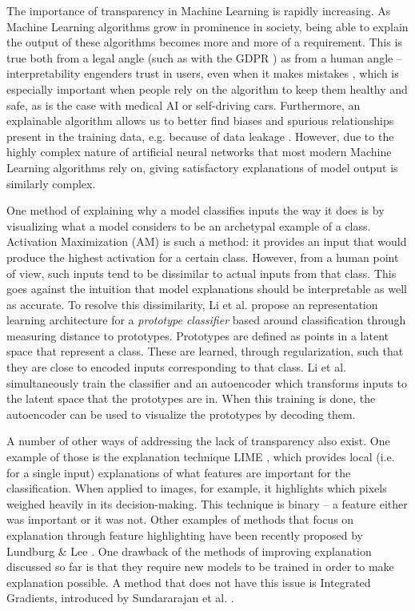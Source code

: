 The importance of transparency in Machine Learning is rapidly increasing. As Machine Learning algorithms grow in prominence in society, being able to explain the output of these algorithms becomes more and more of a requirement. This is true both from a legal angle (such as with the GDPR \citep{gdprart}) as from a human angle -- interpretability engenders trust in users, even when it makes mistakes \citep{automtrust}, which is especially important when people rely on the algorithm to keep them healthy and safe, as is the case with medical AI or self-driving cars. Furthermore, an explainable algorithm allows us to better find biases and spurious relationships present in the training data, e.g. because of data leakage \citep{dataleakage}. However, due to the highly complex nature of artificial neural networks that most modern Machine Learning algorithms rely on, giving satisfactory explanations of model output is similarly complex.

One method of explaining why a model classifies inputs the way it does is by visualizing what a model considers to be an archetypal example of a class. Activation Maximization (AM) \citep{activationmaximization} is such a method: it provides an input that would produce the highest activation for a certain class. However, from a human point of view, such inputs tend to be dissimilar to actual inputs from that class. This goes against the intuition that model explanations should be interpretable as well as accurate. To resolve this dissimilarity, Li et al. \citep{li2018deep} propose an representation learning architecture for a \textit{prototype classifier} based around classification through measuring distance to prototypes. Prototypes are defined as points in a latent space that represent a class. These are learned, through regularization, such that they are close to encoded inputs corresponding to that class. Li et al. simultaneously train the classifier and an autoencoder \citep{autoencoderpaper} which transforms inputs to the latent space that the prototypes are in. When this training is done, the autoencoder can be used to visualize the prototypes by decoding them.

A number of other ways of addressing the lack of transparency also exist. One example of those is the explanation technique LIME \citep{LIME}, which provides local (i.e. for a single input) explanations of what features are important for the classification. When applied to images, for example, it highlights which pixels weighed heavily in its decision-making. This technique is binary -- a feature either was important or it was not. Other examples of methods that focus on explanation through feature highlighting have been recently proposed by Lundburg \& Lee \citep{featureexamplepaper1}. One drawback of the methods of improving explanation discussed so far is that they require new models to be trained in order to make explanation possible. A method that does not have this issue is Integrated Gradients, introduced by Sundararajan et al. \citep{axioms}.

